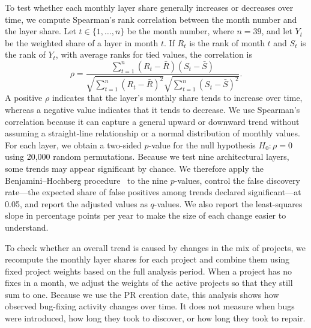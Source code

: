 To test whether each monthly layer share generally increases or decreases over time, we compute Spearman's rank correlation between the month number and the layer share. Let $t\in\{1,\ldots,n\}$ be the month number, where $n=39$, and let $Y_t$ be the weighted share of a layer in month $t$. If $R_t$ is the rank of month $t$ and $S_t$ is the rank of $Y_t$, with average ranks for tied values, the correlation is
\begin{equation}
\rho =
\frac{\sum_{t=1}^{n}(R_t-\bar{R})(S_t-\bar{S})}
{\sqrt{\sum_{t=1}^{n}(R_t-\bar{R})^2}
 \sqrt{\sum_{t=1}^{n}(S_t-\bar{S})^2}}.
\label{eq:spearman_temporal}
\end{equation}
A positive $\rho$ indicates that the layer's monthly share tends to increase over time, whereas a negative value indicates that it tends to decrease. We use Spearman's correlation because it can capture a general upward or downward trend without assuming a straight-line relationship or a normal distribution of monthly values. For each layer, we obtain a two-sided $p$-value for the null hypothesis $H_0:\rho=0$ using 20,000 random permutations. Because we test nine architectural layers, some trends may appear significant by chance. We therefore apply the Benjamini--Hochberg procedure~\cite{benjamini1995controlling} to the nine $p$-values, control the false discovery rate---the expected share of false positives among trends declared significant---at 0.05, and report the adjusted values as $q$-values. We also report the least-squares slope in percentage points per year to make the size of each change easier to understand.

To check whether an overall trend is caused by changes in the mix of projects, we recompute the monthly layer shares for each project and combine them using fixed project weights based on the full analysis period. When a project has no fixes in a month, we adjust the weights of the active projects so that they still sum to one. Because we use the PR creation date, this analysis shows how observed bug-fixing activity changes over time. It does not measure when bugs were introduced, how long they took to discover, or how long they took to repair.
